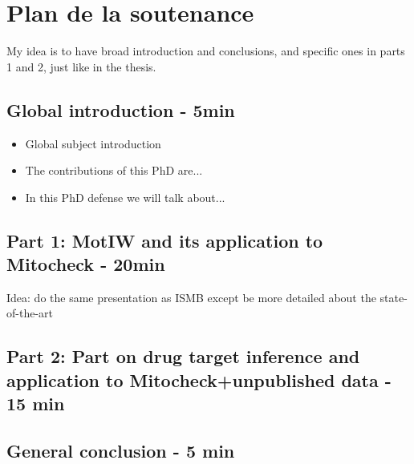 \documentclass[12pt]{article}
\begin{document}
\section{Plan de la soutenance}
My idea is to have broad introduction and conclusions, and specific ones in parts 1 and 2, just like in the thesis.
\subsection*{Global introduction - 5min}
\begin{itemize}
\item Global subject introduction
\item The contributions of this PhD are... 
\item In this PhD defense we will talk about...
\end{itemize}
\subsection*{Part 1: MotIW and its application to Mitocheck - 20min}
Idea: do the same presentation as ISMB except be more detailed about the state-of-the-art
\subsection*{Part 2: Part on drug target inference and application to Mitocheck+unpublished data - 15 min}
\subsection*{General conclusion - 5 min}
\end{document}
